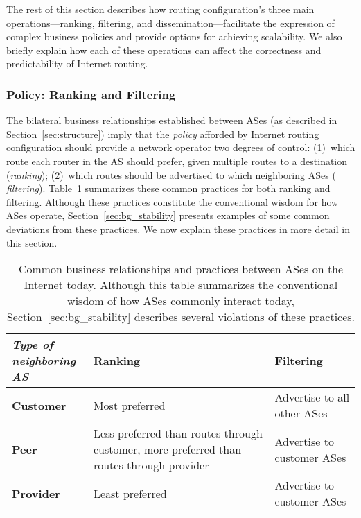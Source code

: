 The rest of this section describes how routing configuration's three
main operations---ranking, filtering, and dissemination---facilitate
the expression of complex business policies and provide options for
achieving scalability.  We also briefly explain how each of these
operations can affect the correctness and predictability of Internet
routing. 

\subsubsection{Policy: Ranking and Filtering}

The bilateral business relationships established between ASes (as
described in Section~\ref{sec:structure}) imply that the {\em policy}
afforded by Internet routing configuration should provide a network operator
two degrees of control: (1)~which route each router in the AS should
prefer, given multiple routes to a destination ({\em ranking});
(2)~which routes should be advertised to which neighboring ASes ({\em
filtering}).  Table~\ref{tab:business} summarizes these common practices
for both ranking and filtering.  Although these practices constitute the
conventional wisdom for how ASes operate, Section~\ref{sec:bg_stability}
presents examples of some common deviations from these practices.  We
now explain these practices in more detail in this section.

\begin{table}
\centering\begin{tabular}{p{1in}||p{2.35in}|p{2.05in}}
\parbox{1in}{{\em Type of \\neighboring AS}}  & {\bf Ranking} & {\bf
Filtering} \\ \hline  
{\bf Customer} & Most preferred & 
Advertise to all other ASes \\ 
{\bf Peer} & Less preferred than routes through customer, more preferred
than routes through provider & Advertise to customer ASes \\
{\bf Provider} & Least preferred & Advertise to customer ASes
\\
\end{tabular}
\caption[Common business relationships and practices between
ASes]{Common business relationships and practices between ASes on the 
Internet today.  Although this table summarizes the conventional wisdom
of how ASes commonly interact today, Section~\ref{sec:bg_stability}
describes several violations of these practices.}
\label{tab:business}
\end{table}

